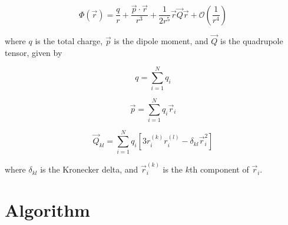 \documentclass[10pt,a4paper,twoside]{article}
\begin{document}
\begin{equation}\label{eq:multipole}
	\Phi(\vec{r}) = \frac{q}{r} + \frac{\vec{p} \cdot \vec{r}}{r^3} + \frac{1}{2r^5}\vec{r}\vec{Q}\vec{r} + \mathcal{O}\left(\frac{1}{r^4}\right)
\end{equation}

where $q$ is the total charge, $\vec{p}$ is the dipole moment, and $\vec{Q}$ is the quadrupole tensor, given by

\begin{equation}\label{eq:charge}
	q = \sum_{i=1}^N q_i
\end{equation}

\begin{equation}\label{eq:dipole}
	\vec{p} = \sum_{i=1}^N q_i \vec{r}_i
\end{equation}

\begin{equation}\label{eq:quadrupole}
	\vec{Q}_{kl} = \sum_{i=1}^N q_i \left[ 3r_i^{(k)}r_i^{(l)} - \delta_{kl}\vec{r}_i^2 \right]
\end{equation}

where $\delta_{kl}$ is the Kronecker delta, and $\vec{r}_i^{(k)}$ is the $k$th component of $\vec{r}_i$.

\section{Algorithm}
\label{sec:Algo}
\medskip
\end{document}
